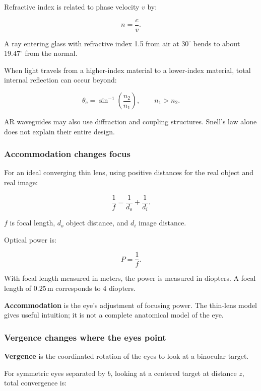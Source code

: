 Refractive index is related to phase velocity \(v\) by:

\[
n=\frac{c}{v}.
\]

A ray entering glass with refractive index 1.5 from air at \(30^\circ\) bends to about \(19.47^\circ\) from the normal.

When light travels from a higher-index material to a lower-index material, total internal reflection can occur beyond:

\[
\theta_c=\sin^{-1}\left(\frac{n_2}{n_1}\right),
\qquad n_1>n_2.
\]

AR waveguides may also use diffraction and coupling structures. Snell's law alone does not explain their entire design.

\subsubsection{Accommodation changes focus}\label{04-visual-computing-ii-ch042-accommodation-changes-focus}

\hypertarget{04-visual-computing-ii-ch042-accommodation-changes-focus}{}

For an ideal converging thin lens, using positive distances for the real object and real image:

\[
\frac1f=\frac1{d_o}+\frac1{d_i}.
\]

\(f\) is focal length, \(d_o\) object distance, and \(d_i\) image distance.

Optical power is:

\[
P=\frac1f.
\]

With focal length measured in meters, the power is measured in diopters. A focal length of \(0.25\,\mathrm{m}\) corresponds to 4 diopters.

\textbf{Accommodation} is the eye's adjustment of focusing power. The thin-lens model gives useful intuition; it is not a complete anatomical model of the eye.

\subsubsection{Vergence changes where the eyes point}\label{04-visual-computing-ii-ch042-vergence-changes-where-the-eyes-point}

\hypertarget{04-visual-computing-ii-ch042-vergence-changes-where-the-eyes-point}{}

\textbf{Vergence} is the coordinated rotation of the eyes to look at a binocular target.

For symmetric eyes separated by \(b\), looking at a centered target at distance \(z\), total convergence is:

